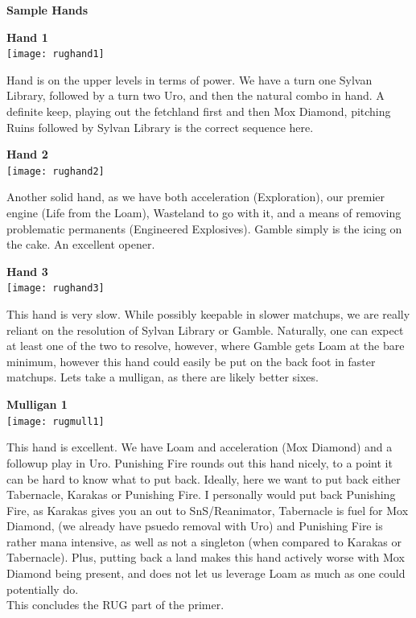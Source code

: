 \documentclass{report}
\begin{document}
\begin{center}
\textbf{Sample Hands}
\end{center}
\begin{center}
\textbf{Hand 1\\}
\texttt{[image: rughand1]}
\end{center}
Hand is on the upper levels in terms of power. We have a turn one Sylvan Library, followed by a turn two Uro, and then the natural combo in hand. A definite keep, playing out the fetchland first and then Mox Diamond, pitching Ruins followed by Sylvan Library is the correct sequence here.
\newpage
\begin{center}
\textbf{Hand 2\\}
\texttt{[image: rughand2]}
\end{center}
Another solid hand, as we have both acceleration (Exploration), our premier engine (Life from the Loam), Wasteland to go with it, and a means of removing problematic permanents (Engineered Explosives). Gamble simply is the icing on the cake. An excellent opener.
\begin{center}
\textbf{Hand 3\\}
\texttt{[image: rughand3]}
\end{center}
This hand is very slow. While possibly keepable in slower matchups, we are really reliant on the resolution of Sylvan Library or Gamble. Naturally, one can expect at least one of the two to resolve, however, where Gamble gets Loam at the bare minimum, however this hand could easily be put on the back foot in faster matchups. Lets take a mulligan, as there are likely better sixes.
\begin{center}
\textbf{Mulligan 1\\}
\texttt{[image: rugmull1]}
\end{center}
This hand is excellent. We have Loam and acceleration (Mox Diamond) and a followup play in Uro. Punishing Fire rounds out this hand nicely, to a point it can be hard to know what to put back. Ideally, here we want to put back either Tabernacle, Karakas or Punishing Fire. I personally would put back Punishing Fire, as Karakas gives you an out to SnS/Reanimator, Tabernacle is fuel for Mox Diamond, (we already have psuedo removal with Uro) and Punishing Fire is rather mana intensive, as well as not a singleton (when compared to Karakas or Tabernacle). Plus, putting back a land makes this hand actively worse with Mox Diamond being present, and does not let us leverage Loam as much as one could potentially do.\\
This concludes the RUG part of the primer.
\end{document}
